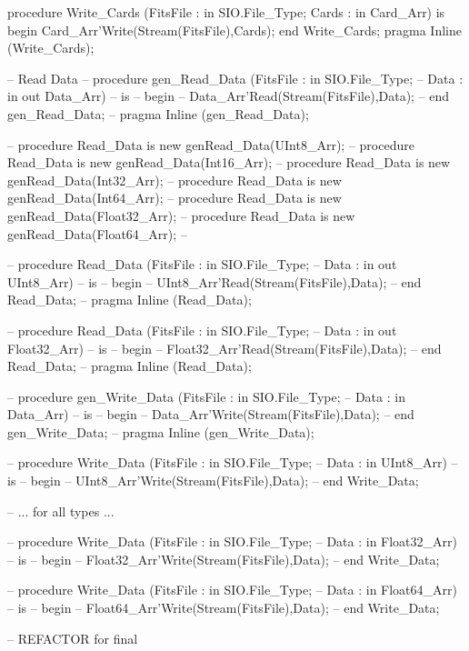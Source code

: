    procedure Write_Cards (FitsFile : in SIO.File_Type;
                          Cards    : in Card_Arr)
   is
   begin
     Card_Arr'Write(Stream(FitsFile),Cards);
   end Write_Cards;
   pragma Inline (Write_Cards);


   -- Read Data
--   procedure gen_Read_Data (FitsFile : in  SIO.File_Type;
--                            Data     : in out Data_Arr)
--   is
--   begin
--     Data_Arr'Read(Stream(FitsFile),Data);
--   end gen_Read_Data;
--   pragma Inline (gen_Read_Data);

--   procedure Read_Data is new genRead_Data(UInt8_Arr);
--   procedure Read_Data is new genRead_Data(Int16_Arr);
--   procedure Read_Data is new genRead_Data(Int32_Arr);
--   procedure Read_Data is new genRead_Data(Int64_Arr);
--   procedure Read_Data is new genRead_Data(Float32_Arr);
--   procedure Read_Data is new genRead_Data(Float64_Arr);
--

--   procedure Read_Data (FitsFile : in  SIO.File_Type;
--                        Data     : in out UInt8_Arr)
--   is
--   begin
--     UInt8_Arr'Read(Stream(FitsFile),Data);
--   end Read_Data;
--   pragma Inline (Read_Data);

--   procedure Read_Data (FitsFile : in  SIO.File_Type;
--                        Data     : in out Float32_Arr)
--   is
--   begin
--     Float32_Arr'Read(Stream(FitsFile),Data);
--   end Read_Data;
--   pragma Inline (Read_Data);

--   procedure gen_Write_Data (FitsFile : in SIO.File_Type;
--                             Data     : in Data_Arr)
--   is
--   begin
--     Data_Arr'Write(Stream(FitsFile),Data);
--   end gen_Write_Data;
--   pragma Inline (gen_Write_Data);


--   procedure Write_Data (FitsFile : in SIO.File_Type;
--                         Data     : in UInt8_Arr)
--   is
--   begin
--     UInt8_Arr'Write(Stream(FitsFile),Data);
--   end Write_Data;

   -- ... for all types ...

--   procedure Write_Data (FitsFile : in SIO.File_Type;
--                         Data     : in Float32_Arr)
--   is
--   begin
--     Float32_Arr'Write(Stream(FitsFile),Data);
--   end Write_Data;

--   procedure Write_Data (FitsFile : in SIO.File_Type;
--                         Data     : in Float64_Arr)
--   is
--   begin
--     Float64_Arr'Write(Stream(FitsFile),Data);
--   end Write_Data;

   -- REFACTOR for final

